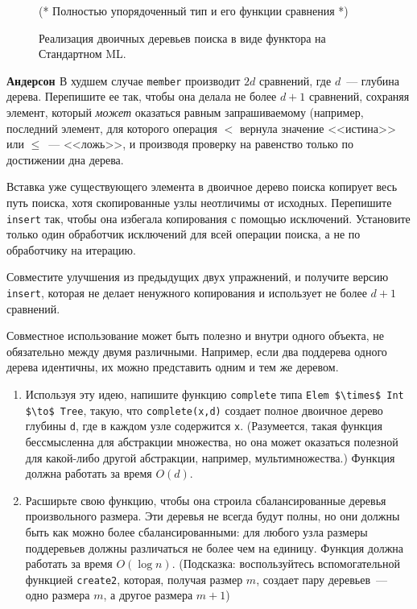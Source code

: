 \begin{figure}
  \centering
  (* Полностью упорядоченный тип и его функции сравнения *)
  \caption{Реализация двоичных деревьев поиска в виде функтора на Стандартном ML.}
  \label{fig:2.9}
\end{figure}

\begin{exercise}\textbf{Андерсон \cite{Andersson1991}}\label{ex:2.2}
В худшем случае \lstinline!member! производит $2d$ сравнений, где
$d$~--- глубина дерева. Перепишите ее так, чтобы она делала не более
$d+1$ сравнений, сохраняя элемент, который \emph{может} оказаться
равным запрашиваемому (например, последний элемент, для которого
операция $<$ вернула значение <<истина>> или $\le$~--- <<ложь>>, и
производя проверку на равенство только по достижении дна дерева.
\end{exercise}

\begin{exercise}\label{ex:2.3}
  Вставка уже существующего элемента в двоичное дерево поиска копирует
  весь путь поиска, хотя скопированные узлы неотличимы от
  исходных. Перепишите \lstinline!insert! так, чтобы она избегала
  копирования с помощью исключений. Установите только один обработчик
  исключений для всей операции поиска, а не по обработчику на итерацию.
\end{exercise}

\begin{exercise}\label{ex:2.4}
  Совместите улучшения из предыдущих двух упражнений, и получите
  версию \lstinline!insert!, которая не делает ненужного копирования и
  использует не более $d+1$ сравнений.
\end{exercise}

\begin{exercise}\label{ex:2.5}
  Совместное использование может быть полезно и внутри одного объекта, не
  обязательно между двумя различными.  Например, если два поддерева
  одного дерева идентичны, их можно представить одним и тем же
  деревом.
  \begin{enumerate}
  \item Используя эту идею, напишите функцию \lstinline!complete! типа
    \lstinline!Elem $\times$ Int $\to$ Tree!, такую, что
    \lstinline!complete(x,d)! создает полное двоичное дерево глубины
    \lstinline!d!, где в каждом узле содержится \lstinline!x!.
    (Разумеется, такая функция бессмысленна для абстракции множества,
    но она может оказаться полезной для какой-либо другой абстракции,
    например, мультимножества.) Функция должна работать за время $O(d)$.
  \item Расширьте свою функцию, чтобы она строила сбалансированные
    деревья произвольного размера. Эти деревья не всегда будут полны,
    но они должны быть как можно более сбалансированными: для любого
    узла размеры поддеревьев должны различаться не более чем на
    единицу. Функция должна работать за время $O(\log n)$. (Подсказка:
    воспользуйтесь вспомогательной функцией \lstinline!create2!,
    которая, получая размер $m$, создает пару деревьев~--- одно размера
    $m$, а другое размера $m+1$)
  \end{enumerate}
\end{exercise}

